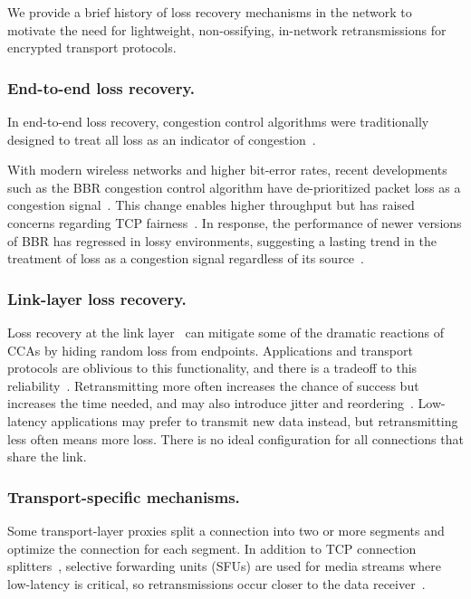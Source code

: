 We provide a brief history of loss recovery mechanisms in the network to
motivate the need for lightweight, non-ossifying, in-network retransmissions
for encrypted transport protocols.

\subsubsection{End-to-end loss recovery.}

In end-to-end loss recovery,
congestion control algorithms were traditionally designed to treat all loss as an indicator of
congestion~\cite{rfc5681tcp,rfc2001tcp}.

With modern wireless networks and higher bit-error rates, recent developments
such as the BBR congestion control
algorithm have de-prioritized packet loss as a congestion
signal~\cite{cardwell2017bbr}. This change enables higher throughput but has
raised concerns regarding TCP fairness~\cite
{ware2019modeling,philip2024prudentia}. In response, the performance of newer
versions of BBR has regressed in lossy environments, suggesting a lasting trend
in the treatment of loss as a congestion signal regardless of its source~\cite
{yuan2025internet}.

\subsubsection{Link-layer loss recovery.}

Loss recovery at the link layer~\cite{3gpp5gstandard,le2022link,ieee80211e} can
mitigate some of the dramatic reactions of CCAs by hiding random loss from
endpoints.
Applications and transport protocols are oblivious to this
functionality, and there is a tradeoff to this reliability~\cite{klingler2018impact,kliazovich2012arqproxy}.
Retransmitting more often increases the chance
of success but increases the time needed, and may also introduce
jitter and reordering~\cite{leung2007overview}.
Low-latency applications may prefer to transmit new data instead, but
retransmitting less often means more loss.
There is no ideal configuration for all connections that share the link.

\subsubsection{Transport-specific mechanisms.}

Some transport-layer proxies split a connection into two or more segments
and optimize the connection for each segment. In addition to
TCP connection splitters~\cite{rfc3135,honda2011still,hayes2019mmwave},
selective forwarding units (SFUs) are
used for media streams where low-latency is critical, so retransmissions occur
closer to the data receiver~\cite{rfc7667,andre2018comparative}.


